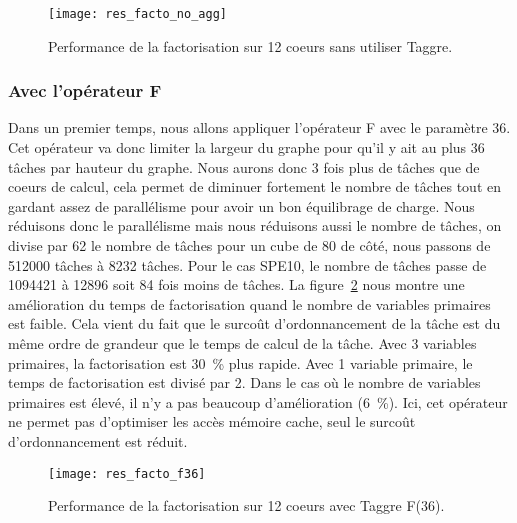 \begin{figure}[!h]
  \centering
  \texttt{[image: res\_facto\_no\_agg]}
  \caption{Performance de la factorisation sur 12 coeurs sans utiliser Taggre.}
  \label{fig:res_facto_no_agg}
\end{figure}




\subsubsection{Avec l'opérateur F}
Dans un premier temps, nous allons appliquer l'opérateur F avec le paramètre 36.
%
Cet opérateur va donc limiter la largeur du graphe pour qu'il y ait au plus 36 tâches par hauteur du graphe.
%
Nous aurons donc 3 fois plus de tâches que de coeurs de calcul, cela permet de diminuer fortement le nombre de tâches tout en gardant assez de parallélisme pour avoir un bon équilibrage de charge.
%
Nous réduisons donc le parallélisme mais nous réduisons aussi le nombre de tâches, on divise par 62 le nombre de tâches pour un cube de 80 de côté, nous passons de 512000 tâches à 8232 tâches.
%
Pour le cas SPE10, le nombre de tâches passe de 1094421 à 12896 soit 84 fois moins de tâches.
%
La figure~\ref{fig:res_facto_f36} nous montre une amélioration du temps de factorisation quand le nombre de variables primaires est faible.
%
Cela vient du fait que le surcoût d'ordonnancement de la tâche est du même ordre de grandeur que le temps de calcul de la tâche.
%
Avec 3 variables primaires, la factorisation est 30~\% plus rapide.
%
Avec 1 variable primaire, le temps de factorisation est divisé par 2.
%
Dans le cas où le nombre de variables primaires est élevé, il n'y a pas beaucoup d'amélioration (6~\%).
%
Ici, cet opérateur ne permet pas d'optimiser les accès mémoire cache, seul le surcoût d'ordonnancement est réduit.


\begin{figure}[!h]
  \centering
  \texttt{[image: res\_facto\_f36]}
  \caption{Performance de la factorisation sur 12 coeurs avec Taggre F(36).}
  \label{fig:res_facto_f36}
\end{figure}





